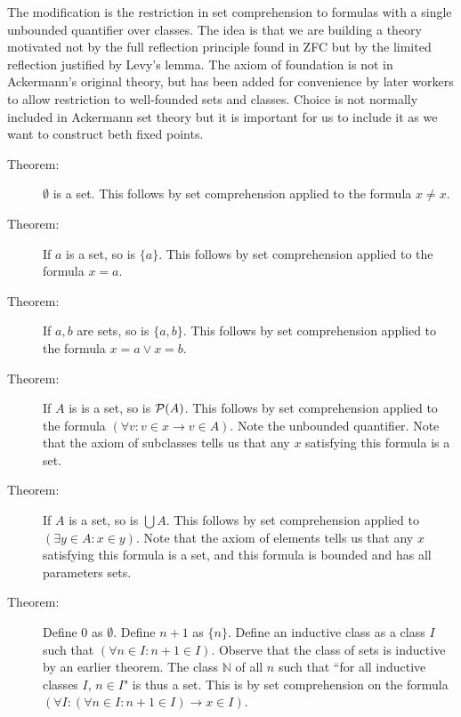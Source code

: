 \documentclass[12pt]{article}
\begin{document}
The modification is the restriction in set comprehension to formulas with a single unbounded quantifier over classes.  The idea is that we are building a theory motivated not by the full reflection principle found in ZFC but by the limited reflection justified by Levy's lemma.  The axiom of foundation is not in Ackermann's original theory, but has been added for convenience by later workers to allow restriction to well-founded sets and classes.  Choice is not normally included in Ackermann set theory but it is important for us to include it as we want to construct beth fixed points.

\begin{description}

\item[Theorem:]  $\emptyset$ is a set.  This follows by set comprehension applied to the formula $x \neq x$.

\item[Theorem:]  If $a$ is a set, so is $\{a\}$.  This follows by set comprehension applied to the formula $x=a$.

\item[Theorem:]  If $a,b$ are sets, so is $\{a,b\}$.  This follows by set comprehension applied to the formula $x=a\vee x=b$.

\item[Theorem:]  If $A$ is is a set, so is ${\cal P}(A)$.  This follows by set comprehension applied to the formula $(\forall v:v \in x \rightarrow v \in A)$.
Note the unbounded quantifier.  Note that the axiom of subclasses tells us that any $x$ satisfying this formula is a set.

\item[Theorem:]  If $A$ is a set, so is $\bigcup A$.  This follows by set comprehension applied to $(\exists y \in A:x \in y)$.   Note that the axiom of elements tells us that any $x$ satisfying this formula is a set, and this formula is bounded and has all parameters sets.

\item[Theorem:]  Define 0 as $\emptyset$.  Define $n+1$ as $\{n\}$.  Define an inductive class as a class $I$ such that $(\forall n \in I:n+1 \in I)$.
Observe that the class of sets is inductive by an earlier theorem.  The class $\mathbb N$ of all $n$ such that ``for all inductive classes $I$, $n \in I$" is thus a set.  This is by set comprehension on the formula $(\forall I:(\forall n \in I:n+1 \in I) \rightarrow x \in I)$.


\end{description}
\end{document}
